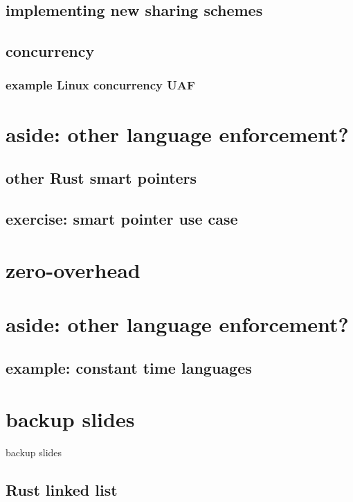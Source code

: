 \subsection{implementing new sharing schemes}


\subsection{concurrency}


\subsubsection{example Linux concurrency UAF}


\section{aside: other language enforcement?}



\subsection{other Rust smart pointers}

\subsection{exercise: smart pointer use case}



\section{zero-overhead}


\section{aside: other language enforcement?}


\subsection{example: constant time languages}


\section{backup slides}
\begin{frame}{backup slides}
\end{frame}


\subsection{Rust linked list}



